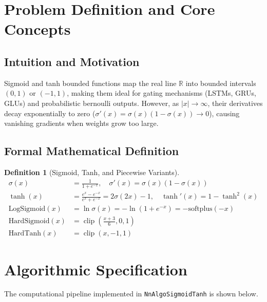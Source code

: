 \documentclass[11pt,a4paper]{article}
\theoremstyle{definition}
\newtheorem{definition}{Definition}[section]
\begin{document}
\section{Problem Definition and Core Concepts}

\subsection{Intuition and Motivation}
Sigmoid and tanh bounded functions map the real line $\mathbb{R}$ into bounded intervals $(0, 1)$ or $(-1, 1)$, making them ideal for gating mechanisms (LSTMs, GRUs, GLUs) and probabilistic bernoulli outputs. However, as $|x| \to \infty$, their derivatives decay exponentially to zero ($\sigma'(x) = \sigma(x)(1 - \sigma(x)) \to 0$), causing vanishing gradients when weights grow too large.

\subsection{Formal Mathematical Definition}
\begin{definition}[Sigmoid, Tanh, and Piecewise Variants]
\begin{align}
\sigma(x) &= \frac{1}{1 + e^{-x}}, \quad \sigma'(x) = \sigma(x)(1 - \sigma(x)) \label{eq:sigmoid_def} \\
\tanh(x) &= \frac{e^x - e^{-x}}{e^x + e^{-x}} = 2\sigma(2x) - 1, \quad \tanh'(x) = 1 - \tanh^2(x) \label{eq:tanh_def} \\
\text{LogSigmoid}(x) &= \ln \sigma(x) = -\ln(1 + e^{-x}) = -\text{softplus}(-x) \label{eq:log_sigmoid_def} \\
\text{HardSigmoid}(x) &= \operatorname{clip}\left(\frac{x + 3}{6}, 0, 1\right) \label{eq:hard_sigmoid} \\
\text{HardTanh}(x) &= \operatorname{clip}(x, -1, 1) \label{eq:hard_tanh}
\end{align}
\end{definition}

\section{Algorithmic Specification}

The computational pipeline implemented in \texttt{NnAlgoSigmoidTanh} is shown below.
\end{document}
